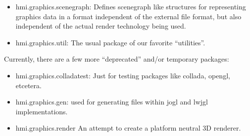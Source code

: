 \begin{itemize}
\item hmi.graphics.scenegraph:
Defines scenegraph like structures for representing graphics data in a format independent of the external file format,
but also independent of the actual render technology being used.
\item hmi.graphics.util:
The usual package of our favorite ``utilities''.

\end{itemize}

Currently, there are a few more ``deprecated'' and/or temporary packages:
\begin{itemize}
\item hmi.graphics.colladatest:
Just for testing packages like collada, opengl, etcetera.
\item hmi.graphics.gen: used for generating files within  jogl and lwjgl implementations.
\item hmi.graphics.render
An attempt to create a platform neutral 3D renderer.
\end{itemize} 